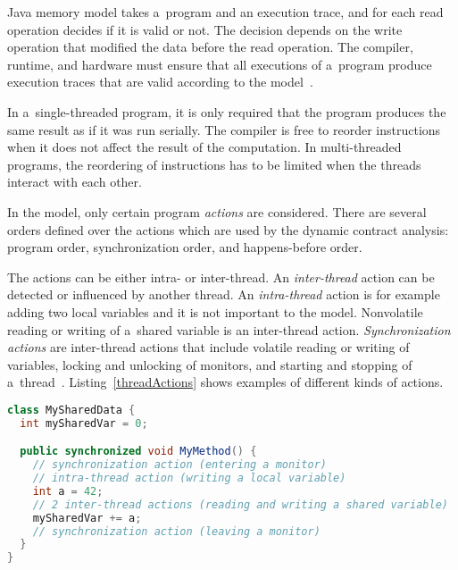 Java memory model takes a~program and an execution trace, and for each read
operation decides if it is valid or not. The decision depends on the write
operation that modified the data before the read operation. The compiler,
runtime, and hardware must ensure that all executions of a~program produce
execution traces that are valid according to the model~\cite{jmmspec}.

In a~single-threaded program, it is only required that the program produces the
same result as if it was run serially. The compiler is free to reorder
instructions when it does not affect the result of the computation. In
multi-threaded programs, the reordering of instructions has to be limited when
the threads interact with each other.

In the model, only certain program \emph{actions} are considered. There are
several orders defined over the actions which are used by the dynamic contract
analysis: program order, synchronization order, and happens-before order.

The actions can be either intra- or inter-thread. An \emph{inter-thread} action
can be detected or influenced by another thread. An \emph{intra-thread} action
is for example adding two local variables and it is not important to the model.
Nonvolatile reading or writing of a~shared variable is an inter-thread action.
\emph{Synchronization actions} are inter-thread actions that include volatile
reading or writing of variables, locking and unlocking of monitors, and starting
and stopping of a~thread~\cite{jmmspec}. Listing~\ref{threadActions} shows
examples of different kinds of actions.

\begin{lstlisting}[language=java, label=threadActions, float=hb,
caption={Various program actions classified from the Java memory model point of
view. Entering and leaving \texttt{MyMethod} produces \emph{synchronization
actions}. Accessing \texttt{mySharedVar} is considered as an \emph{inter-thread}
action, but not as a~synchronization action because \texttt{mySharedVar} is not
declared as \texttt{volatile}.}]
class MySharedData {
  int mySharedVar = 0;

  public synchronized void MyMethod() {
    // synchronization action (entering a monitor)
    // intra-thread action (writing a local variable)
    int a = 42;
    // 2 inter-thread actions (reading and writing a shared variable)
    mySharedVar += a;
    // synchronization action (leaving a monitor)
  }
}
\end{lstlisting}


